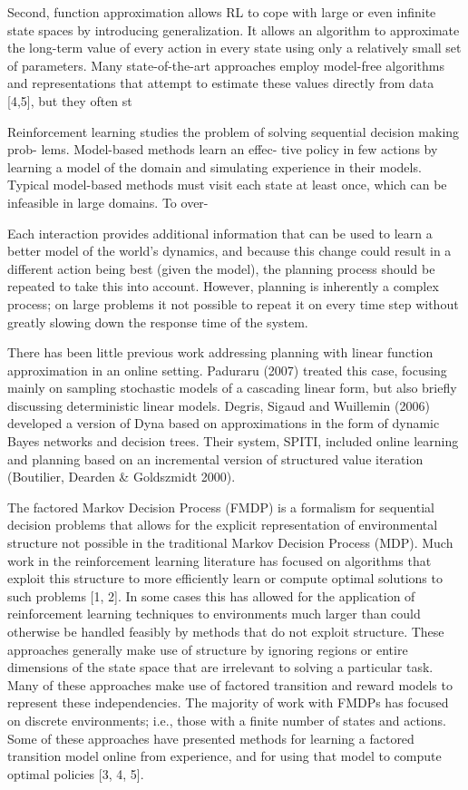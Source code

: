 \documentclass{article} %
\begin{document}
Second, function approximation allows RL to cope with large or even infinite
state spaces by introducing generalization. It allows an algorithm to approximate
the long-term value of every action in every state using only a relatively
small set of parameters. Many state-of-the-art approaches employ model-free
algorithms and representations that attempt to estimate these values directly
from data [4,5], but they often st

Reinforcement learning studies the problem
of solving sequential decision making prob-
lems. Model-based methods learn an effec-
tive policy in few actions by learning a model
of the domain and simulating experience in
their models. Typical model-based methods
must visit each state at least once, which
can be infeasible in large domains. To over-

Each interaction provides additional
information that can be used to learn a better model of the
world’s dynamics, and because this change could result in a
different action being best (given the model), the planning
process should be repeated to take this into account. However,
planning is inherently a complex process; on large
problems it not possible to repeat it on every time step without
greatly slowing down the response time of the system.

\cite{approxModel}
There has been little previous work addressing planning
with linear function approximation in an online setting.
Paduraru (2007) treated this case, focusing mainly on sampling
stochastic models of a cascading linear form, but
also briefly discussing deterministic linear models. Degris,
Sigaud and Wuillemin (2006) developed a version of Dyna
based on approximations in the form of dynamic Bayes networks
and decision trees. Their system, SPITI, included
online learning and planning based on an incremental version
of structured value iteration (Boutilier, Dearden &
Goldszmidt 2000).

The factored Markov Decision Process (FMDP) is a formalism for sequential decision problems
that allows for the explicit representation of environmental structure not possible in the traditional
Markov Decision Process (MDP). Much work in the reinforcement learning literature has focused
on algorithms that exploit this structure to more efficiently learn or compute optimal solutions to
such problems [1, 2]. In some cases this has allowed for the application of reinforcement learning
techniques to environments much larger than could otherwise be handled feasibly by methods that
do not exploit structure. These approaches generally make use of structure by ignoring regions or
entire dimensions of the state space that are irrelevant to solving a particular task. Many of these
approaches make use of factored transition and reward models to represent these independencies.
The majority of work with FMDPs has focused on discrete environments; i.e., those with a finite
number of states and actions. Some of these approaches have presented methods for learning a
factored transition model online from experience, and for using that model to compute optimal
policies [3, 4, 5].
\end{document}
